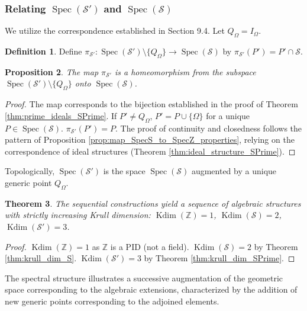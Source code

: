 \documentclass[11pt, a4paper]{article}
\theoremstyle{plain}
\newtheorem{theorem}{Theorem}[section]
\newtheorem{proposition}[theorem]{Proposition}
\theoremstyle{definition}
\newtheorem{definition}[theorem]{Definition}
\numberwithin{equation}{section}
\newcommand{\Z}{\mathbb{Z}}
\newcommand{\OmegaObj}{\Omega} %
\newcommand{\SemiringS}{\mathcal{S}}
\newcommand{\SemiringSPrime}{\mathcal{S}'}
\DeclareMathOperator{\Spec}{Spec}
\DeclareMathOperator{\KrullDim}{Kdim}
\begin{document}
\subsubsection{Relating $\Spec(\SemiringSPrime)$ and $\Spec(\SemiringS)$}

We utilize the correspondence established in Section 9.4. Let $Q_{\OmegaObj}=I_{\OmegaObj}$.

\begin{definition}\label{def:map_SpecSp_to_SpecS}
Define $\pi_{\SemiringSPrime}: \Spec(\SemiringSPrime) \setminus \{Q_{\OmegaObj}\} \to \Spec(\SemiringS)$ by $\pi_{\SemiringSPrime}(P') = P' \cap \SemiringS$.
\end{definition}

\begin{proposition}\label{prop:map_SpecSp_to_SpecS_properties}
The map $\pi_{\SemiringSPrime}$ is a homeomorphism from the subspace $\Spec(\SemiringSPrime) \setminus \{Q_{\OmegaObj}\}$ onto $\Spec(\SemiringS)$.
\end{proposition}
\begin{proof}
The map corresponds to the bijection established in the proof of Theorem \ref{thm:prime_ideals_SPrime}. If $P' \neq Q_{\OmegaObj}$, $P'=P\cup\{\OmegaObj\}$ for a unique $P \in \Spec(\SemiringS)$. $\pi_{\SemiringSPrime}(P') = P$. The proof of continuity and closedness follows the pattern of Proposition \ref{prop:map_SpecS_to_SpecZ_properties}, relying on the correspondence of ideal structures (Theorem \ref{thm:ideal_structure_SPrime}).
\end{proof}

Topologically, $\Spec(\SemiringSPrime)$ is the space $\Spec(\SemiringS)$ augmented by a unique generic point $Q_{\OmegaObj}$.

\begin{theorem}\label{thm:KrullDim_sequence}
The sequential constructions yield a sequence of algebraic structures with strictly increasing Krull dimension:
$\KrullDim(\Z)=1$, $\KrullDim(\SemiringS)=2$, $\KrullDim(\SemiringSPrime)=3$.
\end{theorem}
\begin{proof}
$\KrullDim(\Z)=1$ as $\Z$ is a PID (not a field). $\KrullDim(\SemiringS)=2$ by Theorem \ref{thm:krull_dim_S}. $\KrullDim(\SemiringSPrime)=3$ by Theorem \ref{thm:krull_dim_SPrime}.
\end{proof}

The spectral structure illustrates a successive augmentation of the geometric space corresponding to the algebraic extensions, characterized by the addition of new generic points corresponding to the adjoined elements.
\end{document}
